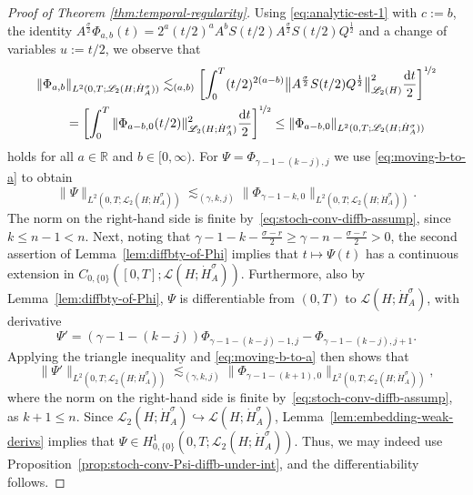 \documentclass[reqno]{amsart}
\numberwithin{equation}{section}
\newcommand{\R}{\mathbb{R}}
\newcommand{\norm}[2]{     \| #1       \|_{ #2 }}
\newcommand{\rd}{\mathop{}\!\mathrm{d}}
\newcommand{\Hdot}[1]{\dot{H}^{#1}_A}
\theoremstyle{remark}
\theoremstyle{definition}
\begin{document}
\begin{proof}[Proof of Theorem \ref{thm:temporal-regularity}]
	Using
	\eqref{eq:analytic-est-1} with $c:=b$, 
	the identity 
	$A^{\frac{\sigma}{2}} \Phi_{a,b}(t) 
	= 
	2^a (t/2)^a A^b S(t/2) A^{\frac{\sigma}{2}} S(t/2) Q^{\frac{1}{2}}$
	and a change of variables $u:=t/2$, we observe that
	\begin{equation}\label{eq:moving-b-to-a}
	\begin{split} 
	\| \Phi_{a,b} 
	&\|_{L^2(0,T;\mathscr L_2(H;\dot H_A^\sigma))} 
	\lesssim_{(a,b)}  
	\biggl[ 
	\int_0^T
	(t/2)^{2(a-b)} 
	\bigl\| A^{\frac{\sigma}{2}} S(t/2) Q^{\frac{1}{2}} \bigr\|_{\mathscr L_2(H)}^2 
	\frac{\rd t}{2} 
	\biggr]^{\nicefrac{1}{2}} 
	\\
	&= 
	\biggl[ 
	\int_0^T
	\| \Phi_{a-b,0}(t/2) \|_{\mathscr L_2(H;\dot H_A^\sigma)}^2 
	\frac{\rd t}{2}
	\biggr]^{\nicefrac{1}{2}} 
	\le 
	\norm{\Phi_{a-b,0}}{L^2(0,T;\mathscr L_2(H;\dot H_A^\sigma))} 
	\end{split} 
	\end{equation}
	holds 
	for all 
	$a\in\R$ and 
	$b\in[0,\infty)$. 
	For $\Psi=\Phi_{\gamma-1-(k-j),j}$ 
	we use \eqref{eq:moving-b-to-a} to obtain
	\[
	\norm{\Psi}{L^2(0,T;\mathscr L_2(H;\dot H_A^\sigma))} 
	\lesssim _{(\gamma,k,j)} 
	\norm{\Phi_{\gamma-1-k,0}}{L^2(0,T;\mathscr L_2(H;\dot H_A^\sigma))}.
	\] 
	The norm on the right-hand side is finite 
	by~\eqref{eq:stoch-conv-diffb-assump}, since 
	$k \leq n - 1 < n$.
	Next, noting that 
	$\gamma-1-k-\frac{\sigma-r}{2} 
	\geq 
	\gamma - n - \frac{\sigma-r}{2} > 0$, 
	the second assertion of Lemma~\ref{lem:diffbty-of-Phi} 
	implies that $t \mapsto \Psi(t)$ 
	has a continuous extension in 
	$C_{0,\{0\}}([0,T]; \mathscr L(H;\dot H_A^\sigma))$.
	Furthermore, also by Lemma~\ref{lem:diffbty-of-Phi},
	$\Psi$ is differentiable from 
	$(0,T)$ to $\mathscr L(H;\Hdot\sigma)$, 
	with derivative 
	\[
	\Psi' 
	= 
	(\gamma-1-(k-j))\Phi_{\gamma-1-(k-j)-1, j} 
	- 
	\Phi_{\gamma-1-(k-j), j+1}.
	\] 
	Applying the 
	triangle inequality and \eqref{eq:moving-b-to-a} 
	then shows that 
	\[ 
	\norm{\Psi'}{L^2(0,T;\mathscr L_2(H;\dot H_A^\sigma))} 
	\lesssim _{(\gamma,k,j)}
	\norm{\Phi_{\gamma-1-(k+1),0}}{L^2(0,T;\mathscr L_2(H;\dot H_A^\sigma))}, 
	\] 
	where the norm on the right-hand side is finite 
	by~\eqref{eq:stoch-conv-diffb-assump},  
	as ${k + 1 \leq n }$. 
	Since 
	$\mathscr L_2(H;\Hdot\sigma) 
	\hookrightarrow
	\mathscr L(H;\Hdot\sigma)$, 
	Lemma~\ref{lem:embedding-weak-derivs} implies that 
	$\Psi \in H^1_{0,\{0\}}(0,T; \mathscr L_2(H;\Hdot\sigma))$.
	Thus, we may indeed use 
	Proposition~\ref{prop:stoch-conv-Psi-diffb-under-int}, 
	and the differentiability follows.  
	

\end{proof}
\end{document}
